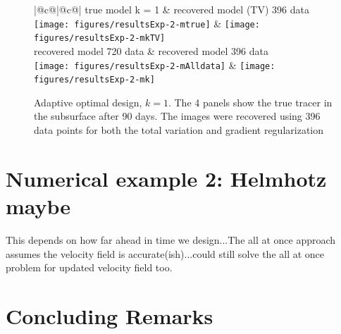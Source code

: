 \documentclass[12pt]{article}
\begin{document}
\begin{figure}[!h]
	\renewcommand{\arraystretch}{1.5}
	\begin{center}
		\iwidth=100mm
		\begin{tabular}{{|@{}c@{}|@{}c@{}|}} %
			\hline		
			true model k = 1
			&
			recovered model (TV) 396 data	
			\\
			\hline		
			\texttt{[image: figures/resultsExp-2-mtrue]}
			&
			\texttt{[image: figures/resultsExp-2-mkTV]}
			\\
			\hline
			recovered model 720 data 
			&
			recovered model 396 data	
			\\
			\hline		
			\texttt{[image: figures/resultsExp-2-mAlldata]}
			&
			\texttt{[image: figures/resultsExp-2-mk]}
			\\
			\hline
		\end{tabular}
	\end{center}
	\caption{Adaptive optimal design, $k=1$. The 4 panels show the true tracer in the subsurface after 90 days. The images were recovered using 396 data points for both the total variation and gradient regularization}
	\label{fig:results1}
\end{figure}













\section{Numerical example 2: Helmhotz maybe} 
This depends on how far ahead in time we design...The all at once approach assumes the velocity field is accurate(ish)...could still solve the all at once problem for updated velocity field too. 



\section{Concluding Remarks}








\end{document}
